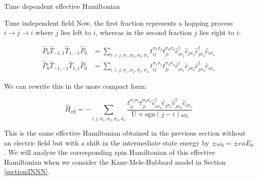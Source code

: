 \begin{section}{Time dependent effective Hamiltonian}
\begin{subsection}{Time independent field}
Now, the first fraction represents a hopping process $i\rightarrow j \rightarrow i$ where $j$ lies left to $i$, whereas in the second fraction $j$ lies right to $i$:

\begin{align*}
\hat{P}_0 \hat{T}_{-1,1} \hat{T}_{1,-1} \hat{P}_0 &= \sum_{i > j, \sigma_1, \sigma_2, \sigma_3, \sigma_4} t_{ij}^{\sigma_1 \sigma_2} t_{ji}^{\sigma_3 \sigma_4} \hat{c}_{i \sigma_1}^\dagger \hat{c}_{j \sigma_2} \hat{c}_{j \sigma_3}^\dagger \hat{c}_{i \sigma_4} \\
\hat{P}_0 \hat{T}_{-1,-1} \hat{T}_{1,1} \hat{P}_0 &= \sum_{i < j, \sigma_1, \sigma_2, \sigma_3, \sigma_4} t_{ij}^{\sigma_1 \sigma_2} t_{ji}^{\sigma_3 \sigma_4} \hat{c}_{i \sigma_1}^\dagger \hat{c}_{j \sigma_2} \hat{c}_{j \sigma_3}^\dagger \hat{c}_{i \sigma_4} 
\end{align*}

We can rewrite this in the more compact form:

\begin{equation}
\label{TimeIndepHeff}
\hat{H}_{\text{eff}} = -\sum_{i, j, \sigma_1, \sigma_2, \sigma_3, \sigma_4} \frac{t_{ij}^{\sigma_1 \sigma_2} t_{ji}^{\sigma_3 \sigma_4} \hat{c}_{i \sigma_1}^\dagger \hat{c}_{j \sigma_2} \hat{c}_{j \sigma_3}^\dagger \hat{c}_{i \sigma_4}}{\text{U} + \text{sgn}(j-i)\omega_0}
\end{equation}

This is the same effective Hamiltonian obtained in the previous section without an electric field but with a shift in the intermediate state energy by $\pm \omega_0 = \pm eaE_0$. We will analyze the corresponding spin Hamiltonian of this effective Hamiltonian when we consider the Kane-Mele-Hubbard model in Section \ref{section3NNN}.

\end{subsection}

\end{section}
